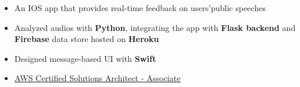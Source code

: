 \vspace{-1mm}
\begin{itemize}
\item An IOS app that provides real-time feedback on users\rq  \space public speeches
\item Analyzed audios with \textbf{Python}, integrating the app with \textbf{Flask backend} and \textbf{Firebase} data store hosted on \textbf{Heroku}
\item Designed message-based UI with \textbf{Swift}
\end{itemize}
\vspace{-2mm}


 


\begin{itemize}
    \item \href{https://tianyizhangawscert.s3.amazonaws.com/AWS+Certified+Solutions+Architect+-+Associate+certificate.pdf}{AWS Certified Solutions Architect - Associate}
\end{itemize}


